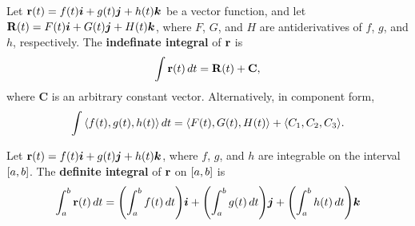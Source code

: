 \documentclass[mathNotesPreamble]{subfiles}
\begin{document}
  \begin{defn*}
    Let ${\mathbf{r}}(t)=f(t) {\bm{i}}+g(t) {\bm{j}}+h(t) {\bm{k}}$ be a vector function, and let \newline $\mathbf R(t)=F(t) {\bm{i}}+G(t) {\bm{j}}+H(t) {\bm{k}}$, where $F$, $G$, and $H$ are antiderivatives of $f$, $g$, and $h$, respectively. The \textbf{indefinate integral} of ${\mathbf{r}}$ is
      \[\int{\mathbf{r}}(t)\,dt=\mathbf R(t)+\mathbf C,\]
    where $\mathbf C$ is an arbitrary constant vector. Alternatively, in component form,
      \[\int{\left\langle f(t),g(t),h(t) \right\rangle}\,dt={\left\langle F(t),G(t),H(t) \right\rangle}+{\left\langle C_1,C_2,C_3 \right\rangle}.\]
  \end{defn*}
  
  \begin{defn*}
    Let ${\mathbf{r}}(t)=f(t){\bm{i}}+g(t){\bm{j}}+h(t){\bm{k}}$, where $f$, $g$, and $h$ are integrable on the interval ${\left[a,b\right]}$. The \textbf{definite integral} of ${\mathbf{r}}$ on ${\left[a,b\right]}$ is
      \[\int_a^b {\mathbf{r}}(t)\,dt={\left(\int_a^b f(t)\,dt\right)}{\bm{i}}+{\left(\int_a^b g(t)\,dt\right)}{\bm{j}}+{\left(\int_a^b h(t)\,dt\right)}{\bm{k}}\]
  \end{defn*}
  \pagebreak
  
\end{document}
